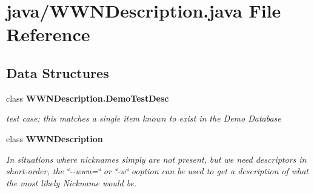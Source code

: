 \section{java/\+W\+W\+N\+Description.java File Reference}
\label{WWNDescription_8java}
\subsection*{Data Structures}
\begin{DoxyCompactItemize}
\item 
class {\bf W\+W\+N\+Description.\+Demo\+Test\+Desc}
\begin{DoxyCompactList}\small\item\em test case\+: this matches a single item known to exist in the Demo Database \end{DoxyCompactList}\item 
class {\bf W\+W\+N\+Description}
\begin{DoxyCompactList}\small\item\em In situations where nicknames simply are not present, but we need descriptors in short-\/order, the \char`\"{}-\/-\/wwn=\char`\"{} or \char`\"{}-\/w\char`\"{} ooption can be used to get a description of what the most likely Nickname would be. \end{DoxyCompactList}\end{DoxyCompactItemize}

